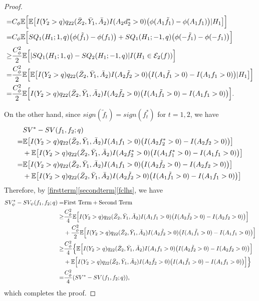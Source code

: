 \documentclass[10pt]{article}
\theoremstyle{remark} \newtheorem{rem}{Remark}
\begin{document}
\begin{proof}
\begin{align}
        =& C_\phi\mathbb{E}\Big[ \mathbb{E}\big[I(Y_2>q)q_{22}(\bar Z_{2}, \bar Y_{1}, \bar A_{2})I(A_2d_2^*>0)\big(\phi(A_1\tilde f_1)-\phi(A_1f_1)\big)|H_1\big]\Big] \notag\\
        =& C_\phi\mathbb{E}\Big[SQ_1(H_1;1,q)\big(\phi(\tilde f_1)-\phi(f_1)\big) + SQ_1(H_1;-1,q)\big(\phi(-\tilde f_1)-\phi(-f_1)\big)  \Big] \notag\\
        \geq& \frac{C^2_\phi}{2}\mathbb{E}\Big[|SQ_1(H_1;1,q)-SQ_2(H_1;-1,q)|I(H_1\in \mathcal{E}_2(f))\Big] \notag\\
        =& \frac{C^2_\phi}{2}\mathbb{E} \Big[\mathbb{E} \big[I(Y_2>q)q_{22}(\bar Z_{2}, \bar Y_{1}, \bar A_{2})I(A_2\tilde f_2>0)\big(I(A_1\tilde f_1>0)-I(A_1f_1>0)\big)|H_1\big]\Big] \notag\\
        =& \frac{C^2_\phi}{2}\mathbb{E} \Big[I(Y_2>q)q_{22}(\bar Z_{2}, \bar Y_{1}, \bar A_{2})I(A_2\tilde f_2>0)\big(I(A_1\tilde f_1>0)-I(A_1f_1>0)\big)\Big]. \label{secondterm}
    \end{align}
    
    On the other hand, since $sign(\tilde f_t)=sign(f_t^*)$ for $t=1,2$, we have
    \begin{align}
        &SV^*-SV(f_1,f_2;q)  \notag\\
        =& \mathbb{E} \big[I(Y_2>q)q_{22}(\bar Z_{2}, \bar Y_{1}, \bar A_{2})I(A_1f_1>0)\big(I(A_2f_2^*>0)-I(A_2f_2>0)\big)\big] \notag\\
        &+ \mathbb{E} \big[I(Y_2>q)q_{22}(\bar Z_{2}, \bar Y_{1}, \bar A_{2})I(A_2 f_2^*>0)\big(I(A_1 f_1^*>0)-I(A_1f_1>0)\big)\big] \notag\\
        =& \mathbb{E} \big[I(Y_2>q)q_{22}(\bar Z_{2}, \bar Y_{1}, \bar A_{2})I(A_1f_1>0)\big(I(A_2\tilde f_2>0)-I(A_2f_2>0)\big)\big] \notag\\
        &+ \mathbb{E} \big[I(Y_2>q)q_{22}(\bar Z_{2}, \bar Y_{1}, \bar A_{2})I(A_2\tilde f_2>0)\big(I(A_1\tilde f_1>0)-I(A_1f_1>0)\big)\big] \label{fclhs}
    \end{align}
    Therefore, by \eqref{firstterm}\eqref{secondterm}\eqref{fclhs}, we have 
    \begin{align}
        SV_\psi^* - SV_\psi(f_1,f_2;q) =& \text{First Term} + \text{Second Term} \notag\\
        \geq& \frac{C_\phi^2}{4}\mathbb{E} \Big[I(Y_2>q)q_{22}(\bar Z_{2}, \bar Y_{1}, \bar A_{2}) I(A_1f_1>0) \big(I(A_2\tilde f_2>0)-I(A_2f_2>0)\big)\Big] \notag\\
        &+\frac{C^2_\phi}{2}\mathbb{E} \Big[I(Y_2>q)q_{22}(\bar Z_{2}, \bar Y_{1}, \bar A_{2})I(A_2\tilde f_2>0)\big(I(A_1\tilde f_1>0)-I(A_1f_1>0)\big)\Big] \notag\\
        \geq& \frac{C_\phi^2}{4}\Big\{\mathbb{E} \Big[I(Y_2>q)q_{22}(\bar Z_{2}, \bar Y_{1}, \bar A_{2}) I(A_1f_1>0) \big(I(A_2\tilde f_2>0)-I(A_2f_2>0)\big)\Big] \notag \\
        &+ \mathbb{E} \Big[I(Y_2>q)q_{22}(\bar Z_{2}, \bar Y_{1}, \bar A_{2})I(A_2\tilde f_2>0)\big(I(A_1\tilde f_1>0)-I(A_1f_1>0)\big)\Big]\Big\} \notag\\
        =& \frac{C_\phi^2}{4}(SV^*-SV(f_1,f_2;q)),
    \end{align}
    which completes the proof.
\end{proof}
\end{document}
